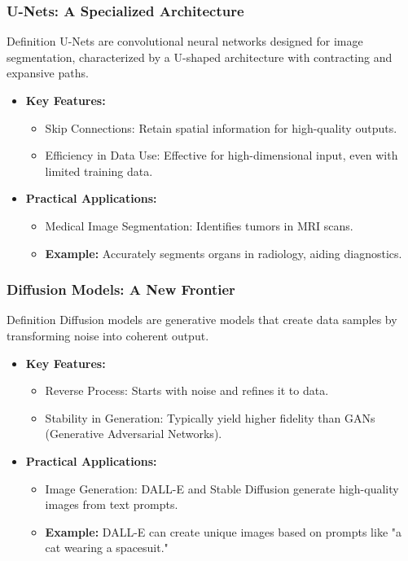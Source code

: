 \documentclass[aspectratio=169]{beamer}
\begin{document}
\begin{frame}[fragile]
    \frametitle{U-Nets: A Specialized Architecture}
    \begin{block}{Definition}
        U-Nets are convolutional neural networks designed for image segmentation, characterized by a U-shaped architecture with contracting and expansive paths.
    \end{block}

    \begin{itemize}
        \item \textbf{Key Features:}
        \begin{itemize}
            \item Skip Connections: Retain spatial information for high-quality outputs.
            \item Efficiency in Data Use: Effective for high-dimensional input, even with limited training data.
        \end{itemize}
        
        \item \textbf{Practical Applications:}
        \begin{itemize}
            \item Medical Image Segmentation: Identifies tumors in MRI scans.
            \item \textbf{Example:} Accurately segments organs in radiology, aiding diagnostics.
        \end{itemize}
    \end{itemize}
\end{frame}

\begin{frame}[fragile]
    \frametitle{Diffusion Models: A New Frontier}
    \begin{block}{Definition}
        Diffusion models are generative models that create data samples by transforming noise into coherent output.
    \end{block}

    \begin{itemize}
        \item \textbf{Key Features:}
        \begin{itemize}
            \item Reverse Process: Starts with noise and refines it to data.
            \item Stability in Generation: Typically yield higher fidelity than GANs (Generative Adversarial Networks).
        \end{itemize}

        \item \textbf{Practical Applications:}
        \begin{itemize}
            \item Image Generation: DALL-E and Stable Diffusion generate high-quality images from text prompts.
            \item \textbf{Example:} DALL-E can create unique images based on prompts like "a cat wearing a spacesuit."
        \end{itemize}
    \end{itemize}
\end{frame}
\end{document}
